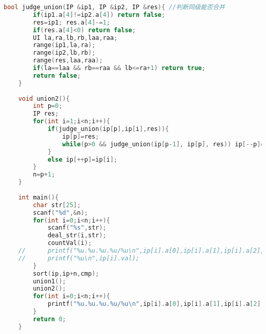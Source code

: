 \begin{lstlisting}[language=C++]
    bool judge_union(IP &ip1, IP &ip2, IP &res){ //判断同级能否合并 
        if(ip1.a[4]!=ip2.a[4]) return false;
        res=ip1; res.a[4]-=1;
        if(res.a[4]<0) return false;
        UI la,ra,lb,rb,laa,raa;
        range(ip1,la,ra);
        range(ip2,lb,rb);
        range(res,laa,raa);
        if(la==laa && rb==raa && lb<=ra+1) return true;
        return false;
    }
    
    void union2(){
        int p=0;
        IP res;
        for(int i=1;i<n;i++){
            if(judge_union(ip[p],ip[i],res)){
                ip[p]=res;
                while(p>0 && judge_union(ip[p-1], ip[p], res)) ip[--p]=res;
            }
            else ip[++p]=ip[i];
        }
        n=p+1;
    }
    
    int main(){
        char str[25];
        scanf("%d",&n);
        for(int i=0;i<n;i++){
            scanf("%s",str);
            deal_str(i,str);
            countVal(i);
    //		printf("%u.%u.%u.%u/%u\n",ip[i].a[0],ip[i].a[1],ip[i].a[2],ip[i].a[3],ip[i].a[4]);
    //		printf("%u\n",ip[i].val);
        }
        sort(ip,ip+n,cmp);
        union1();
        union2();
        for(int i=0;i<n;i++){
            printf("%u.%u.%u.%u/%u\n",ip[i].a[0],ip[i].a[1],ip[i].a[2],ip[i].a[3],ip[i].a[4]);
        } 
        return 0;
    }    
\end{lstlisting}